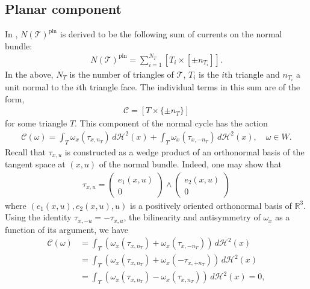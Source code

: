 \documentclass[sn-mathphys-num]{sn-jnl}%
\theoremstyle{thmstyleone}%
\theoremstyle{thmstyletwo}%
\theoremstyle{thmstylethree}%
\numberwithin{remark}{section}
\numberwithin{definition}{section}
\numberwithin{equation}{section}
\numberwithin{theorem}{section}
\newcommand{\R}{\ensuremath{\mathbb{R}}}%
\begin{document}
\subsection{Planar component}
In \cite{NCpaper}, $N(\mathcal{T})^{\mathrm{pln}}$ is derived to be the following sum of currents on the normal bundle:
\begin{align*}
        N(\mathcal{T})^{\mathrm{pln}}  = \sum_{i=1}^{N_{T}}{ [T_{i} \times [ \pm n_{T_{i}}] ] }.
\end{align*}
In the above, $N_{T}$ is the number of triangles of $\mathcal{T}$, $T_{i}$ is the $i$th triangle and $n_{T_{i}}$ a unit normal to the $i$th triangle face. The individual terms in this sum are of the form,
\begin{align*}
   \mathcal{C} = [T \times \{\pm n_{T}\}]
\end{align*}
for some triangle $T$. This component of the normal cycle has the action
\begin{align*}
    \mathcal{C}(\omega) = \int_{T}{\omega_{x}(\tau_{x,n_{T}})\,d\mathcal{H}^{2}(x)} +  \int_{T}{\omega_{x}(\tau_{x,-n_{T}})\,d\mathcal{H}^{2}(x)},\quad \omega \in W.
\end{align*}
Recall that $\tau_{x,u}$ is constructed as a wedge product of an orthonormal basis of the tangent space at $(x,u)$ of the normal bundle. Indeed, one may show \cite{NCpaper} that 
\begin{align*}
    \tau_{x,u} = \begin{pmatrix} e_1(x,u) \\ 0  \end{pmatrix}\wedge  \begin{pmatrix} e_2(x,u) \\ 0  \end{pmatrix}%
\end{align*}
where $(e_{1}(x,u),e_{2}(x,u),u)$ is a positively oriented orthonormal basis of $\R^{3}$. Using the identity $ \tau_{x,-u}=- \tau_{x,u}$, the bilinearity and antisymmetry of $\omega_{x}$ as a function of its argument, we have
\begin{align*}
     \mathcal{C}(\omega) &= \int_{T}{(\omega_{x}(\tau_{x,n_{T}}) + \omega_{x}(\tau_{x,-n_{T}}))\,d\mathcal{H}^{2}(x)} \\
     &= \int_{T}{(\omega_{x}(\tau_{x,n_{T}}) + \omega_{x}(-\tau_{x,+n_{T}}))\,d\mathcal{H}^{2}(x)}
   \\  &= \int_{T}{(\omega_{x}(\tau_{x,n_{T}}) - \omega_{x}(\tau_{x,n_{T}})) \,d\mathcal{H}^{2}(x)} = 0,
\end{align*}
\end{document}
